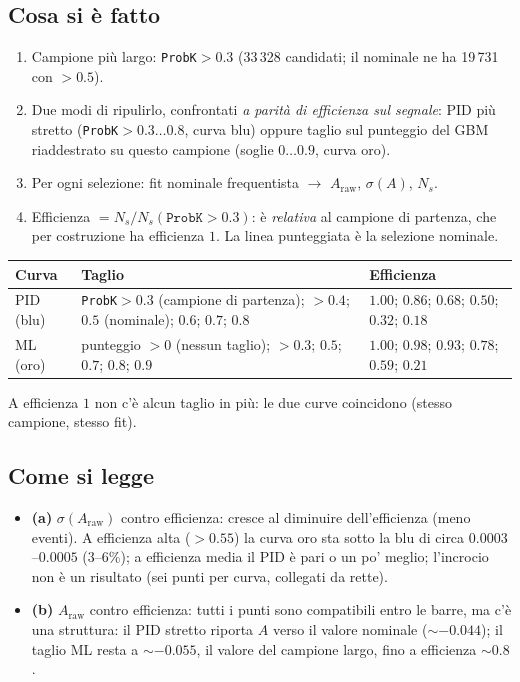 \documentclass[10.5pt,a4paper]{article}
\newcommand{\Araw}{A_{\mathrm{raw}}}
\begin{document}
\subsection*{Cosa si è fatto}
\begin{enumerate}
\item Campione più largo: \texttt{ProbK}$>0.3$ (33\,328 candidati; il nominale ne ha 19\,731 con $>0.5$).
\item Due modi di ripulirlo, confrontati \emph{a parità di efficienza sul segnale}: PID più stretto (\texttt{ProbK}$>0.3\dots0.8$,
curva blu) oppure taglio sul punteggio del GBM riaddestrato su questo campione (soglie $0\dots0.9$, curva oro).
\item Per ogni selezione: fit nominale frequentista $\to$ $\Araw$, $\sigma(A)$, $N_s$.
\item Efficienza $=N_s/N_s(\texttt{ProbK}>0.3)$: è \emph{relativa} al campione di partenza, che per costruzione ha efficienza $1$. La linea
punteggiata è la selezione nominale.
\end{enumerate}
\begin{center}\small\begin{tabular}{p{1.9cm}p{6.8cm}p{5.3cm}}\toprule
Curva & Taglio & Efficienza\\\midrule
PID (blu) & \texttt{ProbK}$>0.3$ (campione di partenza); $>0.4$; $0.5$ (nominale); $0.6$; $0.7$; $0.8$ & $1.00$; $0.86$; $0.68$; $0.50$; $0.32$; $0.18$\\
ML (oro) & punteggio $>0$ (nessun taglio); $>0.3$; $0.5$; $0.7$; $0.8$; $0.9$ & $1.00$; $0.98$; $0.93$; $0.78$; $0.59$; $0.21$\\\bottomrule
\end{tabular}\end{center}
A efficienza $1$ non c'è alcun taglio in più: le due curve coincidono (stesso campione, stesso fit).

\subsection*{Come si legge}
\begin{itemize}
\item \textbf{(a)} $\sigma(\Araw)$ contro efficienza: cresce al diminuire dell'efficienza (meno eventi). A efficienza alta ($>0.55$) la
curva oro sta sotto la blu di circa $0.0003$--$0.0005$ ($3$--$6\%$); a efficienza media il PID è pari o un po' meglio; l'incrocio
non è un risultato (sei punti per curva, collegati da rette).
\item \textbf{(b)} $\Araw$ contro efficienza: tutti i punti sono compatibili entro le barre, ma c'è una struttura: il PID stretto riporta
$A$ verso il valore nominale ($\sim-0.044$); il taglio ML resta a $\sim-0.055$, il valore del campione largo, fino a efficienza $\sim0.8$.
\end{itemize}
\end{document}
